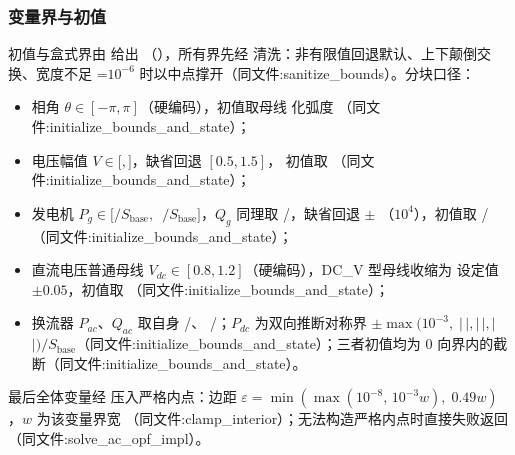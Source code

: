 \subsubsection*{变量界与初值}
初值与盒式界由  给出
（），所有界先经
 清洗：非有限值回退默认、上下颠倒交换、宽度不足
=$10^{-6}$ 时以中点撑开（同文件:sanitize\_bounds）。分块口径：
\begin{itemize}
  \item 相角 $\theta\in[-\pi,\pi]$（硬编码），初值取母线  化弧度
        （同文件:initialize\_bounds\_and\_state）；
  \item 电压幅值 $V\in[$$,$$]$，缺省回退 $[0.5,1.5]$，
        初值取 （同文件:initialize\_bounds\_and\_state）；
  \item 发电机 $P_g\in[$$/S_{\mathrm{base}},\,$
        $/S_{\mathrm{base}}]$，$Q_g$ 同理取
        /，缺省回退 $\pm$
        （$10^4$），初值取 /（同文件:initialize\_bounds\_and\_state）；
  \item 直流电压普通母线 $V_{dc}\in[0.8,1.2]$（硬编码），DC\_V 型母线收缩为
        设定值 $\pm0.05$，初值取 （同文件:initialize\_bounds\_and\_state）；
  \item 换流器 $P_{ac}$、$Q_{ac}$ 取自身 /、
        /；$P_{dc}$ 为双向推断对称界
        $\pm\max(10^{-3},\;|\,$$|,|\,$$|,|\,$
        $|)/S_{\mathrm{base}}$（同文件:initialize\_bounds\_and\_state）；三者初值均为
        0 向界内的截断（同文件:initialize\_bounds\_and\_state）。
\end{itemize}
最后全体变量经  压入严格内点：边距
$\varepsilon=\min(\max(10^{-8},\,10^{-3}w),\;0.49w)$，$w$ 为该变量界宽
（同文件:clamp\_interior）；无法构造严格内点时直接失败返回
（同文件:solve\_ac\_opf\_impl）。


